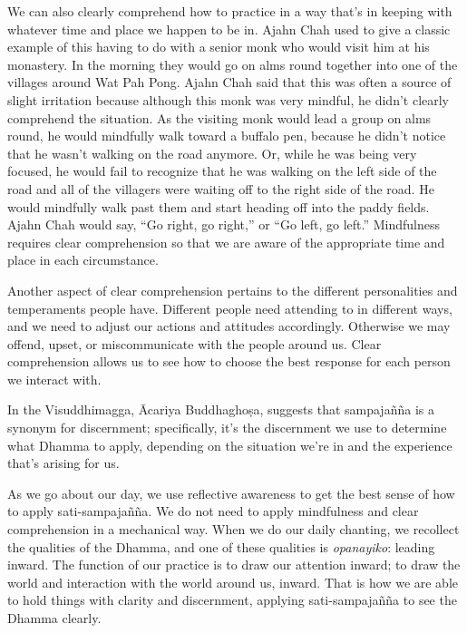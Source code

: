We can also clearly comprehend how to practice in a way that's in 
keeping with whatever time and place we happen to be in. Ajahn Chah 
used to give a classic example of this having to do with a senior monk 
who would visit him at his monastery. In the morning they would go on 
alms round together into one of the villages around Wat Pah Pong. Ajahn 
Chah said that this was often a source of slight irritation because 
although this monk was very mindful, he didn't clearly comprehend the 
situation. As the visiting monk would lead a group on alms round, he 
would mindfully walk toward a buffalo pen, because he didn't notice 
that he wasn't walking on the road anymore. Or, while he was being very 
focused, he would fail to recognize that he was walking on the left 
side of the road and all of the villagers were waiting off to the right 
side of the road. He would mindfully walk past them and start heading 
off into the paddy fields. Ajahn Chah would say, ``Go right, go 
right,'' or ``Go left, go left.'' Mindfulness requires clear 
comprehension so that we are aware of the appropriate time and place in 
each circumstance.

Another aspect of clear comprehension pertains to the different 
personalities and temperaments people have. Different people need 
attending to in different ways, and we need to adjust our actions and 
attitudes accordingly. Otherwise we may offend, upset, or 
miscommunicate with the people around us. Clear comprehension allows us 
to see how to choose the best response for each person we interact with.

In the Visuddhimagga, Ācariya Buddhaghoṣa, suggests that 
sampajañña is a synonym for discernment; specifically, it's the 
discernment we use to determine what Dhamma to apply, depending on the 
situation we're in and the experience that's arising for us.

As we go about our day, we use reflective awareness to get the best 
sense of how to apply sati-sampajañña. We do not need to apply 
mindfulness and clear comprehension in a mechanical way. When we do our 
daily chanting, we recollect the qualities of the Dhamma, and one of 
these qualities is \emph{opanayiko}: leading inward. The function of 
our practice is to draw our attention inward; to draw the world and 
interaction with the world around us, inward. That is how we are able 
to hold things with clarity and discernment, applying sati-sampajañña 
to see the Dhamma clearly.



